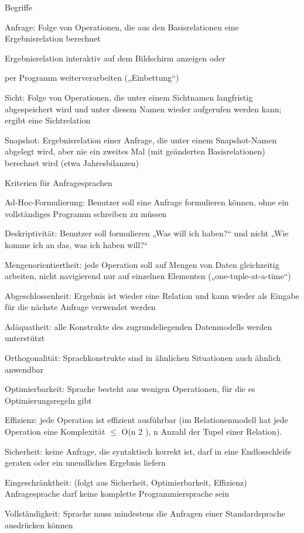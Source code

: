 \documentclass[a4paper]{article}
\begin{document}
\begin{multicols}{3}
Begriffe
\begin{itemize*}
    \item Anfrage: Folge von Operationen, die aus den Basisrelationen eine Ergebnisrelation berechnet
    \begin{itemize*}
        \item Ergebnisrelation interaktiv auf dem Bildschirm anzeigen oder
        \item per Programm weiterverarbeiten („Einbettung“)
    \end{itemize*}
    \item Sicht: Folge von Operationen, die unter einem Sichtnamen langfristig abgespeichert wird und unter diesem Namen wieder aufgerufen werden kann; ergibt eine Sichtrelation
    \item Snapshot: Ergebnisrelation einer Anfrage, die unter einem Snapshot-Namen abgelegt wird, aber nie ein zweites Mal (mit geänderten Basisrelationen) berechnet wird (etwa Jahresbilanzen)
\end{itemize*}

Kriterien für Anfragesprachen
\begin{itemize*}
    \item Ad-Hoc-Formulierung: Benutzer soll eine Anfrage formulieren können, ohne ein vollständiges Programm schreiben zu müssen
    \item Deskriptivität: Benutzer soll formulieren „Was will ich haben?“ und nicht „Wie komme ich an das, was ich haben will?“
    \item Mengenorientiertheit: jede Operation soll auf Mengen von Daten gleichzeitig arbeiten, nicht navigierend nur auf einzelnen Elementen („one-tuple-at-a-time“)
    \item Abgeschlossenheit: Ergebnis ist wieder eine Relation und kann wieder als Eingabe für die nächste Anfrage verwendet werden
    \item Adäquatheit: alle Konstrukte des zugrundeliegenden Datenmodells werden unterstützt
    \item Orthogonalität: Sprachkonstrukte sind in ähnlichen Situationen auch ähnlich anwendbar
    \item Optimierbarkeit: Sprache besteht aus wenigen Operationen, für die es Optimierungsregeln gibt
    \item Effizienz: jede Operation ist effizient ausführbar (im Relationenmodell hat jede Operation eine Komplexität $\leq$ O(n 2 ), n Anzahl der Tupel einer Relation).
    \item Sicherheit: keine Anfrage, die syntaktisch korrekt ist, darf in eine Endlosschleife geraten oder ein unendliches Ergebnis liefern
    \item Eingeschränktheit: (folgt aus Sicherheit, Optimierbarkeit, Effizienz) Anfragesprache darf keine komplette Programmiersprache sein
    \item Vollständigkeit: Sprache muss mindestens die Anfragen einer Standardsprache ausdrücken können
\end{itemize*}


\end{multicols}
\end{document}
